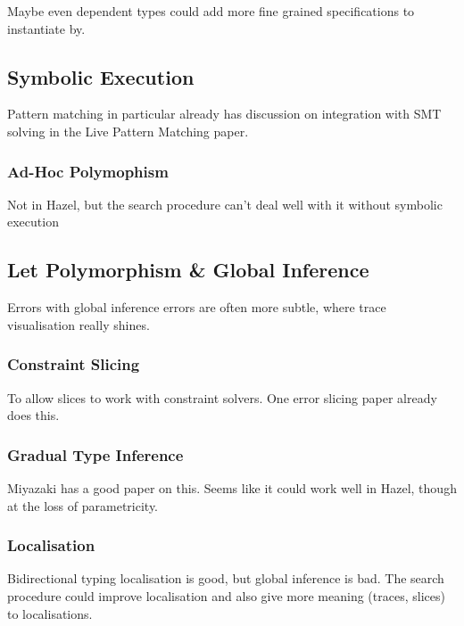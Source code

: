 Maybe even dependent types could add more fine grained specifications to instantiate by.
\subsection{Symbolic Execution}
Pattern matching in particular already has discussion on integration with SMT solving in the Live Pattern Matching paper.

\subsubsection{Ad-Hoc Polymophism}
Not in Hazel, but the search procedure can't deal well with it without symbolic execution

\subsection{Let Polymorphism \& Global Inference}
Errors with global inference errors are often more subtle, where trace visualisation really shines. 
\subsubsection{Constraint Slicing}
To allow slices to work with constraint solvers. One error slicing paper already does this.

\subsubsection{Gradual Type Inference}
Miyazaki has a good paper on this. Seems like it could work well in Hazel, though at the loss of parametricity.

\subsubsection{Localisation}
Bidirectional typing localisation is good, but global inference is bad. The search procedure could improve localisation and also give more meaning (traces, slices) to localisations.